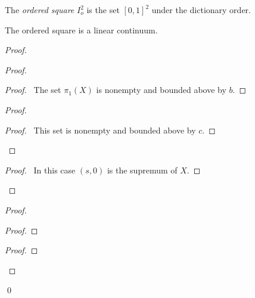 \begin{definition}
    The \emph{ordered square} $I_o^2$ is the set $[0,1]^2$ under the dictionary order.
\end{definition}

\begin{proposition}
    The ordered square is a linear continuum.
\end{proposition}

\begin{proof}
    \pf
    \begin{proof}
        \begin{proof}
            \pf\ The set $\pi_1(X)$ is nonempty and bounded above by $b$.
        \end{proof}
        \begin{proof}
            \begin{proof}
                \pf\ This set is nonempty and bounded above by $c$.
            \end{proof}
        \end{proof}
        \begin{proof}
            \pf\ In this case $(s,0)$ is the supremum of $X$.
        \end{proof}
    \end{proof}
    \begin{proof}
        \begin{proof}
        \end{proof}
        \begin{proof}
        \end{proof}
    \end{proof}
    \qed
\end{proof}

